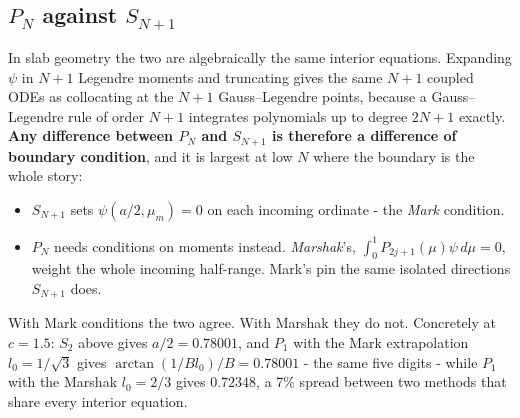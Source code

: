 \documentclass[11pt]{article}
\begin{document}
\subsection*{$P_N$ against $S_{N+1}$}

In slab geometry the two are algebraically the same interior equations. Expanding $\psi$ in $N+1$ Legendre moments and truncating gives the same $N+1$ coupled ODEs as collocating at the $N+1$ Gauss--Legendre points, because a Gauss--Legendre rule of order $N+1$ integrates polynomials up to degree $2N+1$ exactly. \textbf{Any difference between $P_N$ and $S_{N+1}$ is therefore a difference of boundary condition}, and it is largest at low $N$ where the boundary is the whole story:
\begin{itemize}
    \item $S_{N+1}$ sets $\psi(a/2,\mu_m)=0$ on each incoming ordinate - the \emph{Mark} condition.
    \item $P_N$ needs conditions on moments instead. \emph{Marshak}'s, $\int_0^1 P_{2j+1}(\mu)\psi\,d\mu = 0$, weight the whole incoming half-range. Mark's pin the same isolated directions $S_{N+1}$ does.
\end{itemize}
With Mark conditions the two agree. With Marshak they do not. Concretely at $c=1.5$: $S_2$ above gives $a/2 = 0.78001$, and $P_1$ with the Mark extrapolation $l_0=1/\sqrt3$ gives $\arctan(1/Bl_0)/B = 0.78001$ - the same five digits - while $P_1$ with the Marshak $l_0 = 2/3$ gives $0.72348$, a 7\% spread between two methods that share every interior equation.
\end{document}
